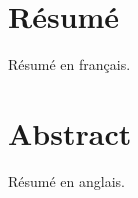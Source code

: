 \chapter*{Résumé}  
Résumé en français.
%
\newpage
\thispagestyle{plain}

\chapter*{Abstract}
Résumé en anglais.
%
\newpage
\thispagestyle{plain}
